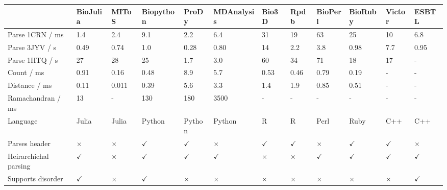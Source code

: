 \begin{table}
\centering

\begin{small}
\begin{tabular}{ llllllllllll }
\hline
                      & BioJulia     & MIToS        & Biopython    & ProDy        & MDAnalysis   & Bio3D        & Rpdb         & BioPerl       & BioRuby      & Victor        & ESBTL        \\
\hline
Parse 1CRN / ms       & 1.4          & 2.4          & 9.1          & 2.2          & 6.4          & 31           & 19           & 63            & 25           & 10            & 6.8          \\
Parse 3JYV / s        & 0.49         & 0.74         & 1.0          & 0.28         & 0.80         & 14           & 2.2          & 3.8           & 0.98         & 7.7           & 0.95         \\
Parse 1HTQ / s        & 27           & 28           & 25           & 1.7          & 3.0          & 60           & 34           & 71            & 18           & 17            & -            \\
Count / ms            & 0.91         & 0.16         & 0.48         & 8.9          & 5.7          & 0.53         & 0.46         & 0.79          & 0.19         & -             & -            \\
Distance / ms         & 0.11         & 0.011        & 0.39         & 5.6          & 3.3          & 1.4          & 1.9          & 0.85          & 0.51         & -             & -            \\
Ramachandran / ms     & 13           & -            & 130          & 180          & 3500         & -            & -            & -             & -            & -             & -            \\
Language              & Julia        & Julia        & Python       & Python       & Python       & R            & R            & Perl          & Ruby         & C++           & C++          \\
Parses header         & $\times$     & $\times$     & $\checkmark$ & $\checkmark$ & $\times$     & $\checkmark$ & $\checkmark$ & $\times$      & $\checkmark$ & $\checkmark$  & $\times$     \\
Heirarchichal parsing & $\checkmark$ & $\times$     & $\checkmark$ & $\checkmark$ & $\checkmark$ & $\times$     & $\times$     & $\checkmark$  & $\checkmark$ & $\checkmark$  & $\checkmark$ \\
Supports disorder     & $\checkmark$ & $\times$     & $\checkmark$ & $\times$     & $\times$     & $\times$     & $\times$     & $\times$      & $\times$     & $\times$      & $\checkmark$ \\

\end{tabular}
\end{small}
\end{table}
